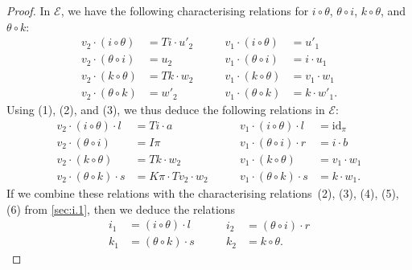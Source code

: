 \documentclass[fleqn]{article}
\newcommand{\id}{\mathrm{id}}
\newcommand{\cat}[1]{\mathcal{#1}}
\begin{document}
\begin{proof}
  In $\cat{E}$, we have the following characterising relations for $i\circ\theta$, $\theta\circ i$, $k\circ\theta$, and $\theta\circ k$:
  \[
    \begin{aligned}
      v_2\cdot(i\circ\theta)
      &= Ti\cdot u'_2
    \\v_2\cdot(\theta\circ i)
      &= u_2
    \\v_2\cdot(k\circ\theta)
      &= Tk\cdot w_2
    \\v_2\cdot(\theta\circ k)
      &= w'_2
    \end{aligned}
    \qquad
    \begin{aligned}
      v_1\cdot(i\circ\theta)
      &= u'_1
    \\v_1\cdot(\theta\circ i)
      &= i\cdot u_1
    \\v_1\cdot(k\circ\theta)
      &= v_1\cdot w_1
    \\v_1\cdot(\theta\circ k)
      &= k\cdot w'_1.
    \end{aligned}
    \tag{3}
  \]
  Using (1), (2), and (3), we thus deduce the following relations in $\cat{E}$:
  \[
    \begin{aligned}
      v_2\cdot(i\circ\theta)\cdot l
      &= Ti\cdot a
    \\v_2\cdot(\theta\circ i)
      &= I\pi
    \\v_2\cdot(k\circ\theta)
      &= Tk\cdot w_2
    \\v_2\cdot(\theta\circ k)\cdot s
      &= K\pi\cdot Tv_2\cdot w_2
    \end{aligned}
    \qquad
    \begin{aligned}
      v_1\cdot(i\circ\theta)\cdot l
      &= \id_\pi
    \\v_1\cdot(\theta\circ i)\cdot r
      &= i\cdot b
    \\v_1\cdot(k\circ\theta)
      &= v_1\cdot w_1
    \\v_1\cdot(\theta\circ k)\cdot s
      &= k\cdot w_1.
    \end{aligned}
  \]
  If we combine these relations with the characterising relations~(2), (3), (4), (5), (6) from \cref{sec:i.1}, then we deduce the relations
  \[
    \begin{aligned}
      i_1
      &= (i\circ\theta)\cdot l
    \\k_1
      &= (\theta\circ k)\cdot s
    \end{aligned}
    \qquad
    \begin{aligned}
      i_2
      &= (\theta\circ i)\cdot r
    \\k_2
      &= k\circ\theta.

\end{aligned}\]
\end{proof}
\end{document}
